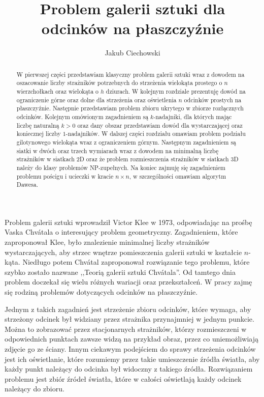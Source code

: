 \documentclass{xmgr}
\author   {Jakub Ciechowski}
\title    {Problem galerii sztuki \newline dla odcinków na płaszczyźnie}
\date     {\ymdtoday}
\theoremstyle{definition}
\begin{document}
\begin{abstract}
 W pierwszej części przedstawiam klasyczny problem galerii sztuki wraz z dowodem na oszacowanie liczby strażników potrzebnych do strzeżenia wielokąta prostego o $n$ wierzchołkach oraz wielokąta o $h$ dziurach. W kolejnym rozdziale prezentuję dowód na ograniczenie górne oraz dolne dla strzeżenia oraz oświetlenia $n$ odcinków prostych na płaszczyźnie. Następnie przedstawiam problem zbioru ukrytego w zbiorze rozłącznych odcinków. Kolejnym omówionym zagadnieniem są $k$-nadajniki, dla których mając liczbę naturalną $k > 0$ oraz dany obszar przedstawiam dowód dla wystarczającej oraz koniecznej liczby $1$-nadajników. W dalszej części rozdziału omawiam problem podziału gilotynowego wielokąta wraz z ograniczeniem górnym. Następnym zagadnieniem są siatki w dwóch oraz trzech wymiarach wraz z dowodem na minimalną liczbę strażników w siatkach 2D oraz że problem rozmieszczenia strażników w siatkach 3D należy do klasy problemów NP-zupełnych. Na koniec zajmuję się zagadnieniem problemu pościgu i ucieczki w kracie $n \times n$, w szczególności omawiam algorytm Dawesa.
\end{abstract}

\maketitle

\introduction
Problem galerii sztuki wprowadził Victor Klee w 1973, odpowiadając na prośbę Vaska Chv\'atala o interesujący problem geometryczny. Zagadnieniem, które zaproponował Klee, było znalezienie minimalnej liczby strażników wystarczających, aby strzec wnętrze pomieszczenia galerii sztuki w kształcie $n$-kąta. Niedługo potem Chv\'atal zaproponował rozwiązanie tego problemu, które szybko zostało nazwane ,,Teorią galerii sztuki Chv\'atala''. Od tamtego dnia problem doczekał się wielu różnych wariacji oraz przekształceń. W pracy zajmę się rodziną problemów dotyczących odcinków na płaszczyźnie. 

Jednym z takich zagadnień jest strzeżenie zbioru odcinków, które wymaga, aby strzeżony odcinek był widziany przez strażnika przynajmniej w jednym punkcie. Można to zobrazować przez stacjonarnych strażników, którzy rozmieszczeni w odpowiednich punktach zawsze widzą na przykład obraz, przez co uniemożliwiają zdjęcie go ze ściany. Innym ciekawym podejściem do sprawy strzeżenia odcinków jest ich oświetlanie, które  rozumiemy przez takie umieszczenie źródła światła, aby każdy punkt należący do odcinka był widoczny z takiego źródła. Rozwiązaniem problemu jest zbiór źródeł światła, które w całości oświetlają każdy odcinek należący do zbioru. 
\end{document}
